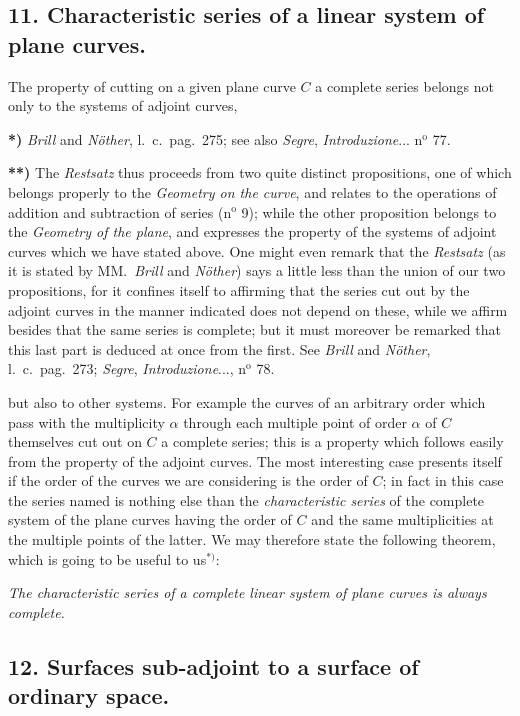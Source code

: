 \documentclass{article}
\begin{document}
\subsection*{11. Characteristic series of a linear system of plane curves.}

The property of cutting on a given plane curve $C$ a complete series belongs not only to the systems of adjoint curves,

\textbf{*)} \emph{Brill} and \emph{Nöther}, l.\ c.\ pag.\ 275; see also \emph{Segre}, \emph{Introduzione}... n${}^{\text{o}}$ 77.

\textbf{**)} The \emph{Restsatz} thus proceeds from two quite distinct propositions, one of which belongs properly to the \emph{Geometry on the curve}, and relates to the operations of addition and subtraction of series (n${}^{\text{o}}$ 9); while the other proposition belongs to the \emph{Geometry of the plane}, and expresses the property of the systems of adjoint curves which we have stated above. One might even remark that the \emph{Restsatz} (as it is stated by MM.\ \emph{Brill} and \emph{Nöther}) says a little less than the union of our two propositions, for it confines itself to affirming that the series cut out by the adjoint curves in the manner indicated does not depend on these, while we affirm besides that the same series is complete; but it must moreover be remarked that this last part is deduced at once from the first. See \emph{Brill} and \emph{Nöther}, l.\ c.\ pag.\ 273; \emph{Segre}, \emph{Introduzione}..., n${}^{\text{o}}$ 78.

but also to other systems. For example the curves of an arbitrary order which pass with the multiplicity $\alpha$ through each multiple point of order $\alpha$ of $C$ themselves cut out on $C$ a complete series; this is a property which follows easily from the property of the adjoint curves. The most interesting case presents itself if the order of the curves we are considering is the order of $C$; in fact in this case the series named is nothing else than the \emph{characteristic series} of the complete system of the plane curves having the order of $C$ and the same multiplicities at the multiple points of the latter. We may therefore state the following theorem, which is going to be useful to us${}^{*)}$:

\emph{The characteristic series of a complete linear system of plane curves is always complete.}

\subsection*{12. Surfaces sub-adjoint to a surface of ordinary space.}
\end{document}
